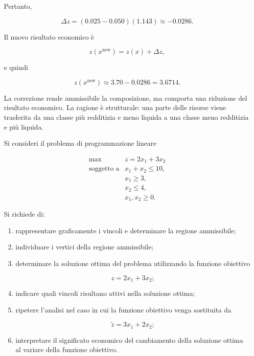 \begin{enumerate}
Pertanto,

\[
\Delta z
=
(0.025-0.050)(1.143)
\approx
-0.0286.
\]

Il nuovo risultato economico \`e

\[
z(x^{\mathrm{new}})
=
z(x)+\Delta z,
\]

\noindent e quindi

\[
z(x^{\mathrm{new}})
\approx
3.70-0.0286
=
3.6714.
\]

La correzione rende ammissibile la composizione, ma comporta una riduzione
del risultato economico. La ragione \`e strutturale: una parte delle risorse
viene trasferita da una classe pi\`u redditizia e meno liquida a una classe
meno redditizia e pi\`u liquida.

\end{enumerate}

\begin{exercise}

\label{ex:cap11-geometria}

Si consideri il problema di programmazione lineare

\[
\begin{array}{ll}
\max
&
z=2x_1+3x_2
\\[3pt]
\mbox{soggetto a}
&
x_1+x_2\leq10,
\\
&
x_1\geq3,
\\
&
x_2\leq4,
\\
&
x_1,x_2\geq0.
\end{array}
\]

Si richiede di:

\begin{enumerate}

\item rappresentare graficamente i vincoli e determinare la regione
ammissibile;

\item individuare i vertici della regione ammissibile;

\item determinare la soluzione ottima del problema utilizzando la funzione
obiettivo

\[
z=2x_1+3x_2;
\]

\item indicare quali vincoli risultano attivi nella soluzione ottima;

\item ripetere l'analisi nel caso in cui la funzione obiettivo venga
sostituita da

\[
\widetilde z=3x_1+2x_2;
\]

\item interpretare il significato economico del cambiamento della soluzione
ottima al variare della funzione obiettivo.

\end{enumerate}

\end{exercise}

